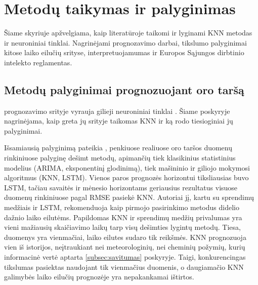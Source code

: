 \documentclass[]{VUMIFTemplateClass}
\begin{document}
    \section{Metodų taikymas ir palyginimas}

    Šiame skyriuje apžvelgiama, kaip literatūroje taikomi ir lyginami KNN metodas ir neuroniniai tinklai.
    Nagrinėjami  prognozavimo darbai, tikslumo palyginimai kitose laiko eilučių srityse, interpretuojamumas ir Europos Sąjungos dirbtinio intelekto reglamentas.


    \subsection{Metodų palyginimai prognozuojant oro taršą}

     prognozavimo srityje vyrauja gilieji neuroniniai tinklai \cite{wu2025}.
    Šiame poskyryje nagrinėjama, kaip greta jų srityje taikomas KNN ir ką rodo tiesioginiai jų palyginimai.

    Išsamiausią palyginimą pateikia \cite{das2021}, penkiuose realiuose oro taršos duomenų rinkiniuose palyginę dešimt metodų, apimančių tiek klasikinius statistinius modelius (ARIMA, eksponentinį glodinimą), tiek mašininio ir giliojo mokymosi algoritmus (KNN, LSTM).
    Vienos paros prognozės horizontui tiksliausias buvo LSTM, tačiau savaitės ir mėnesio horizontams geriausius rezultatus visuose duomenų rinkiniuose pagal RMSE pasiekė KNN.
    Autoriai jį, kartu su sprendimų medžiais ir LSTM, rekomenduoja kaip pirmojo pasirinkimo metodus didelio dažnio  laiko eilutėms.
    Papildomas KNN ir sprendimų medžių privalumas yra vieni mažiausių skaičiavimo laikų tarp visų dešimties lygintų metodų.
    Tiesa, \cite{das2021} duomenys yra vienmačiai, laiko eilutes sudaro tik  reikšmės.
    KNN prognozuoja vien iš  istorijos, neįtraukiant nei meteorologinių, nei cheminių požymių, kurių informacinė vertė aptarta \ref{subsec:savitumas} poskyryje.
    Taigi, konkurencingas tikslumas pasiektas naudojant tik vienmačius duomenis, o daugiamačio KNN galimybės  laiko eilučių prognozėje yra nepakankamai ištirtos.
\end{document}
